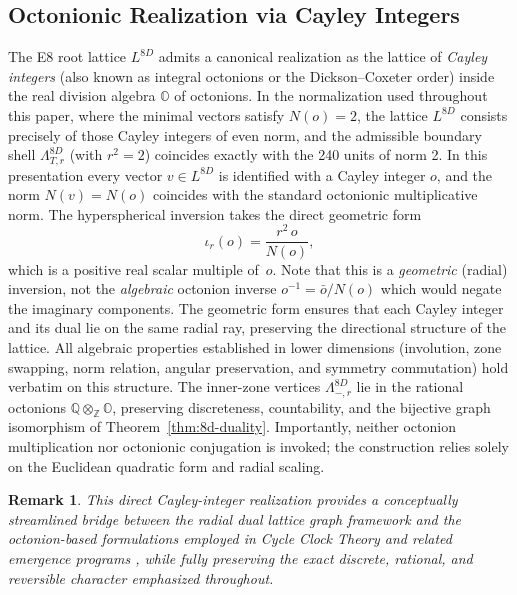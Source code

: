 \documentclass{article}
\newtheorem{remark}{Remark}
\begin{document}
\subsection{Octonionic Realization via Cayley Integers}
The E8 root lattice \(L^{8D}\) admits a canonical realization as the lattice of \emph{Cayley integers} (also known as integral octonions or the Dickson--Coxeter order) inside the real division algebra \(\mathbb{O}\) of octonions. In the normalization used throughout this paper, where the minimal vectors satisfy \(N(o) = 2\), the lattice \(L^{8D}\) consists precisely of those Cayley integers of even norm, and the admissible boundary shell \(\Lambda_{T,r}^{8D}\) (with \(r^2 = 2\)) coincides exactly with the 240 units of norm 2.
In this presentation every vector \(v \in L^{8D}\) is identified with a Cayley integer \(o\), and the norm \(N(v) = N(o)\) coincides with the standard octonionic multiplicative norm. The hyperspherical inversion takes the direct geometric form
\[
\iota_r(o) = \frac{r^2 \, o}{N(o)},
\]
which is a positive real scalar multiple of~\(o\). Note that this is a \emph{geometric} (radial) inversion, not the \emph{algebraic} octonion inverse \(o^{-1} = \bar{o}/N(o)\) which would negate the imaginary components. The geometric form ensures that each Cayley integer and its dual lie on the same radial ray, preserving the directional structure of the lattice.
All algebraic properties established in lower dimensions (involution, zone swapping, norm relation, angular preservation, and symmetry commutation) hold verbatim on this structure. The inner-zone vertices \(\Lambda_{-,r}^{8D}\) lie in the rational octonions \(\mathbb{Q}\otimes_{\mathbb{Z}}\mathbb{O}\), preserving discreteness, countability, and the bijective graph isomorphism of Theorem~\ref{thm:8d-duality}. Importantly, neither octonion multiplication nor octonionic conjugation is invoked; the construction relies solely on the Euclidean quadratic form and radial scaling.
\begin{remark}
This direct Cayley-integer realization provides a conceptually streamlined bridge between the radial dual lattice graph framework and the octonion-based formulations employed in Cycle Clock Theory and related emergence programs \cite{Dixon1994,Furey2016}, while fully preserving the exact discrete, rational, and reversible character emphasized throughout.
\end{remark}
\end{document}
